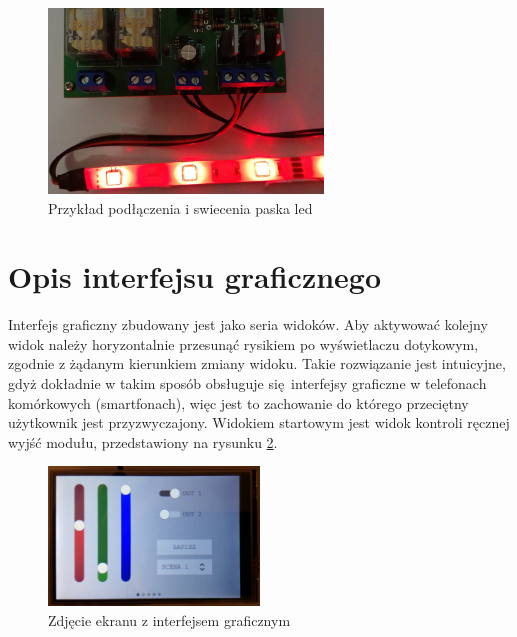 \documentclass[12pt, eng, twoside, openany, final]{mgr}
\begin{document}
        \begin{figure}[H]
        \begin{center}
            \includegraphics[width=0.65\textwidth]{zpaskiem.jpg}
            \caption{Przykład podłączenia i swiecenia paska led}
            \label{fig:strip}
        \end{center}
        \end{figure}
    \newpage
    
    \section{Opis interfejsu graficznego}
    Interfejs graficzny zbudowany jest jako seria widoków. Aby aktywować kolejny widok należy horyzontalnie przesunąć rysikiem po wyświetlaczu dotykowym, zgodnie z żądanym kierunkiem zmiany widoku. Takie rozwiązanie jest intuicyjne, gdyż dokładnie w takim sposób obsługuje się interfejsy graficzne w telefonach komórkowych (smartfonach), więc jest to zachowanie do którego przeciętny użytkownik jest przyzwyczajony.
    Widokiem startowym jest widok kontroli ręcznej wyjść modułu, przedstawiony na rysunku \ref{fig:screen}.
        \begin{figure}[H]
        \begin{center}
            \includegraphics[width=0.5\textwidth]{ui_live.jpg}
            \caption{Zdjęcie ekranu z interfejsem graficznym}
            \label{fig:screen}
        \end{center}
        \end{figure}
    
\end{document}
